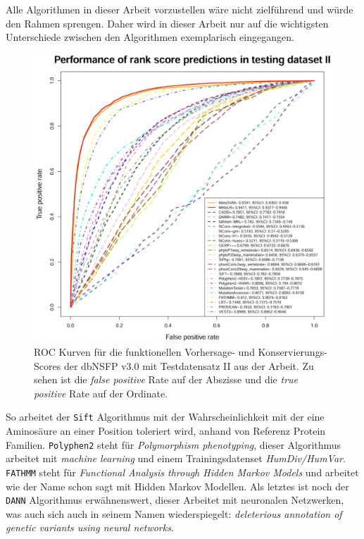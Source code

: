 Alle Algorithmen in dieser Arbeit vorzustellen wäre nicht zielführend und würde den Rahmen sprengen. Daher wird in dieser Arbeit nur auf die wichtigsten Unterschiede zwischen den Algorithmen exemplarisch eingegangen. 

\begin{figure}
\centering
\includegraphics[width=.95\textwidth]{images/compared_prediction_scores.png}
\caption{\ac{ROC} Kurven für die funktionellen Vorhersage- und Konservierungs- Scores der dbNSFP v3.0 mit Testdatensatz II aus der Arbeit\cite{Liu.2016}. Zu sehen ist die \emph{false positive} Rate auf der Abszisse und die \emph{true positive} Rate auf der Ordinate.}
\label{fig:comp_scores}
\end{figure}

So arbeitet der \texttt{Sift}\cite{Vaser.2016} Algorithmus mit der Wahrscheinlichkeit mit der eine Aminosäure an einer Position toleriert wird, anhand von Referenz Protein Familien.
\texttt{Polyphen2}\cite{Adzhubei.2013} steht für \emph{Polymorphism phenotyping}, dieser Algorithmus arbeitet mit \emph{machine learning} und einem Trainingsdatenset \emph{HumDiv/HumVar}.
\texttt{FATHMM}\cite{Shihab.2013} steht für \emph{Functional Analysis through Hidden Markov Models} und arbeitet wie der Name schon sagt mit Hidden Markov Modellen.
Als letztes ist noch der \texttt{DANN} \cite{Quang.2015} Algorithmus erwähnenswert, dieser Arbeitet mit neuronalen Netzwerken, was auch sich auch in seinem Namen wiederspiegelt: \emph{deleterious annotation of genetic variants using neural networks}.

